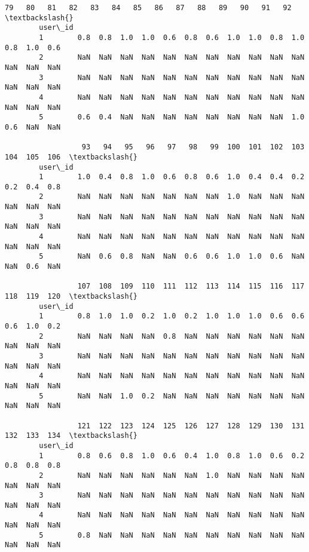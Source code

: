 \documentclass[11pt]{article}
\begin{document}
\begin{Verbatim}[commandchars=\\\{\}]
                  79   80   81   82   83   84   85   86   87   88   89   90   91   92  \textbackslash{}
        user\_id                                                                         
        1        0.8  0.8  1.0  1.0  0.6  0.8  0.6  1.0  1.0  0.8  1.0  0.8  1.0  0.6   
        2        NaN  NaN  NaN  NaN  NaN  NaN  NaN  NaN  NaN  NaN  NaN  NaN  NaN  NaN   
        3        NaN  NaN  NaN  NaN  NaN  NaN  NaN  NaN  NaN  NaN  NaN  NaN  NaN  NaN   
        4        NaN  NaN  NaN  NaN  NaN  NaN  NaN  NaN  NaN  NaN  NaN  NaN  NaN  NaN   
        5        0.6  0.4  NaN  NaN  NaN  NaN  NaN  NaN  NaN  NaN  1.0  0.6  NaN  NaN   
        
                  93   94   95   96   97   98   99  100  101  102  103  104  105  106  \textbackslash{}
        user\_id                                                                         
        1        1.0  0.4  0.8  1.0  0.6  0.8  0.6  1.0  0.4  0.4  0.2  0.2  0.4  0.8   
        2        NaN  NaN  NaN  NaN  NaN  NaN  NaN  1.0  NaN  NaN  NaN  NaN  NaN  NaN   
        3        NaN  NaN  NaN  NaN  NaN  NaN  NaN  NaN  NaN  NaN  NaN  NaN  NaN  NaN   
        4        NaN  NaN  NaN  NaN  NaN  NaN  NaN  NaN  NaN  NaN  NaN  NaN  NaN  NaN   
        5        NaN  0.6  0.8  NaN  NaN  0.6  0.6  1.0  1.0  0.6  NaN  NaN  0.6  NaN   
        
                 107  108  109  110  111  112  113  114  115  116  117  118  119  120  \textbackslash{}
        user\_id                                                                         
        1        0.8  1.0  1.0  0.2  1.0  0.2  1.0  1.0  1.0  0.6  0.6  0.6  1.0  0.2   
        2        NaN  NaN  NaN  NaN  0.8  NaN  NaN  NaN  NaN  NaN  NaN  NaN  NaN  NaN   
        3        NaN  NaN  NaN  NaN  NaN  NaN  NaN  NaN  NaN  NaN  NaN  NaN  NaN  NaN   
        4        NaN  NaN  NaN  NaN  NaN  NaN  NaN  NaN  NaN  NaN  NaN  NaN  NaN  NaN   
        5        NaN  NaN  1.0  0.2  NaN  NaN  NaN  NaN  NaN  NaN  NaN  NaN  NaN  NaN   
        
                 121  122  123  124  125  126  127  128  129  130  131  132  133  134  \textbackslash{}
        user\_id                                                                         
        1        0.8  0.6  0.8  1.0  0.6  0.4  1.0  0.8  1.0  0.6  0.2  0.8  0.8  0.8   
        2        NaN  NaN  NaN  NaN  NaN  NaN  1.0  NaN  NaN  NaN  NaN  NaN  NaN  NaN   
        3        NaN  NaN  NaN  NaN  NaN  NaN  NaN  NaN  NaN  NaN  NaN  NaN  NaN  NaN   
        4        NaN  NaN  NaN  NaN  NaN  NaN  NaN  NaN  NaN  NaN  NaN  NaN  NaN  NaN   
        5        0.8  NaN  NaN  NaN  NaN  NaN  NaN  NaN  NaN  NaN  NaN  NaN  NaN  NaN   
        

\end{Verbatim}
\end{document}
